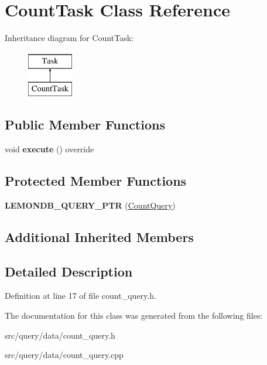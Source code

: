 \hypertarget{class_count_task}{}\section{Count\+Task Class Reference}
\label{class_count_task}
Inheritance diagram for Count\+Task\+:\begin{figure}[H]
\begin{center}
\leavevmode
\includegraphics[height=2.000000cm]{class_count_task}
\end{center}
\end{figure}
\subsection*{Public Member Functions}
\begin{DoxyCompactItemize}
\item 
\mbox{\label{class_count_task_a78489ba36acf7f88bbb87cc138872748}} 
void {\bfseries execute} () override
\end{DoxyCompactItemize}
\subsection*{Protected Member Functions}
\begin{DoxyCompactItemize}
\item 
\mbox{\label{class_count_task_ad53272fd6ecb1fb5e7176bcfcf39b037}} 
{\bfseries L\+E\+M\+O\+N\+D\+B\+\_\+\+Q\+U\+E\+R\+Y\+\_\+\+P\+TR} (\hyperlink{class_count_query}{Count\+Query})
\end{DoxyCompactItemize}
\subsection*{Additional Inherited Members}


\subsection{Detailed Description}


Definition at line 17 of file count\+\_\+query.\+h.



The documentation for this class was generated from the following files\+:\begin{DoxyCompactItemize}
\item 
src/query/data/count\+\_\+query.\+h\item 
src/query/data/count\+\_\+query.\+cpp\end{DoxyCompactItemize}
